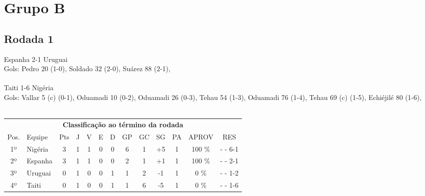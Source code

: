 \documentclass{article}
\begin{document}
\section*{Grupo B}
\subsection*{Rodada 1}
Espanha 2-1 Uruguai\\
Gols: Pedro 20 (1-0), Soldado 32 (2-0), Suárez 88 (2-1), \\
\\
Taiti 1-6 Nigéria\\
Gols: Vallar 5 (c) (0-1), Oduamadi 10 (0-2), Oduamadi 26 (0-3), Tehau 54 (1-3), Oduamadi 76 (1-4), Tehau 69 (c) (1-5), Echiéjilé 80 (1-6), \\
\\
\begin{center}
\begin{tabular}{| c | l | c | c | c | c | c | c | c | c | c | c | c |}
\multicolumn{13}{c}{\textbf{Classificação ao término da rodada}}\\
Pos.&Equipe&Pts&J&V&E&D&GP&GC&SG&PA&APROV&RES\\
1º&Nigéria             &3&1	&1&0&0	&6&1&+5	&1&100 \%	& -  - 6-1 \\
2º&Espanha             &3&1	&1&0&0	&2&1&+1	&1&100 \%	& -  - 2-1 \\
3º&Uruguai             &0&1	&0&0&1	&1&2&-1	&1&  0 \%	& -  - 1-2 \\
4º&Taiti               &0&1	&0&0&1	&1&6&-5	&1&  0 \%	& -  - 1-6 \\
\end{tabular}
\end{center}
\end{document}
